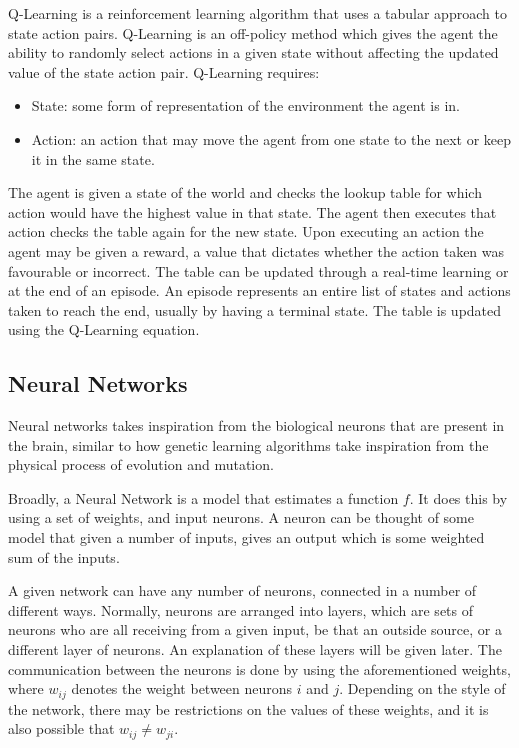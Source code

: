 Q-Learning is a reinforcement learning algorithm that uses a tabular approach to
state action pairs. Q-Learning is an off-policy method which gives the agent the
ability to randomly select actions in a given state without affecting the
updated value of the state action pair. Q-Learning requires:

\begin{itemize}
    \item State: some form of representation of the environment the agent is in.
    \item Action: an action that may move the agent from one state to the next or keep it in the same state.
\end{itemize}

The agent is given a state of the world and checks the lookup table for which
action would have the highest value in that state. The agent then executes that
action checks the table again for the new state. Upon executing an action the
agent may be given a reward, a value that dictates whether the action taken was
favourable or incorrect. The table can be updated through a real-time learning
or at the end of an episode. An episode represents an entire list of states and
actions taken to reach the end, usually by having a terminal state. The table is
updated using the Q-Learning equation.


\subsection{Neural Networks}

Neural networks takes inspiration from the biological neurons that
are present in the brain, similar to how genetic learning
algorithms take inspiration from the physical process of evolution
and mutation\cite{goldberg2006genetic}.

Broadly, a Neural Network is a model that estimates a function $f$.
It does this by using a set of weights, and input neurons. A neuron
can be thought of some model that given a number of inputs, gives
an output which is some weighted sum of the inputs.

A given network can have any number of neurons, connected in a number
of different ways. Normally, neurons are arranged into layers, which
are sets of neurons who are all receiving from a given input, be
that an outside source, or a different layer of neurons. An explanation of
these layers will be given later. The communication
between the neurons is done by using the aforementioned weights, where
$w_{ij}$ denotes the weight between neurons $i$ and $j$. Depending on the
style of the network, there may be restrictions on the values of these
weights, and it is also possible that $w_{ij} \ne w_{ji}$.

